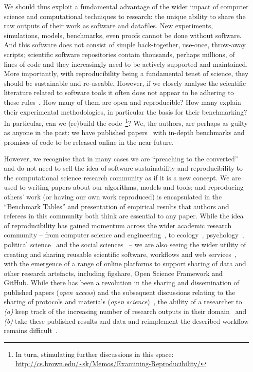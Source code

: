 \documentclass[conference]{IEEEtran}
\begin{document}
We should thus exploit a fundamental advantage of the wider impact of
computer science and computational techniques to research: the unique
ability to share the raw outputs of their work as software and
datafiles. New experiments, simulations, models, benchmarks, even
proofs cannot be done without software. And this software does not
consist of simple hack-together, use-once, throw-away scripts;
scientific software repositories contain thousands, perhaps millions,
of lines of code and they increasingly need to be actively supported
and maintained. More importantly, with reproducibility being a
fundamental tenet of science, they should be sustainable and re-useable. However, if
we closely analyse the scientific literature related to software tools
it often does not appear to be adhering to these
rules~\cite{nature:2011}. How many of them are open and reproducible? How many
explain their experimental methodologies, in particular the basis for
their benchmarking? In particular, can we (re)build the
code~\cite{collberg-et-al:2014}\footnote{In turn, stimulating further
discussions in this space:
\url{http://cs.brown.edu/~sk/Memos/Examining-Reproducibility/}}? We,
the authors, are perhaps as guilty as anyone in the past: we have
published papers~\cite{crick-et-al:2009a,berdine-et-al:2011} with
in-depth benchmarks and promises of code to be released online in the
near future.

However, we recognise that in many cases we are ``preaching to the
converted'' and do not need to sell the idea of software
sustainability and reproducibility to the computational science
research community as if it is a new concept. We are used to writing
papers about our algorithms, models and tools; and reproducing others'
work (or having our own work reproduced) is encapsulated in the
``Benchmark Tables'' and presentation of empirical results that
authors and referees in this community both think are essential to any
paper. While the idea of reproducibility has gained momentum across
the wider academic research community -- from computer science and
engineering~\cite{ledet-et-al:2014,collberg-et-al:2015}, to
ecology~\cite{thiele+grimm:2015},
psychology~\cite{chambers-et-al:2014}, political
science~\cite{king:1995} and the social
sciences~\cite{conte-et-al:2012,hutton+henderson:2015} -- we are also
seeing the wider utility of creating and sharing reusable scientific
software, workflows and web
services~\cite{davidson+freire:2008,crick-et-al:2009b,goble:2014,oabarriaga-et-al:2014},
with the emergence of a range of online platforms to support sharing
of data and other research artefacts, including figshare, Open Science
Framework and GitHub. While there has been a revolution in the sharing
and dissemination of published papers (\emph{open access}) and the
subsequent discussions relating to the sharing of protocols and
materials (\emph{open
science})~\cite{pantonprinciples:2010,force11:2011,rssaaoe:2012}, the
ability of a researcher to {\emph{(a)}} keep track of the increasing
number of research outputs in their domain~\cite{parolo-et-al:2015}
and {\emph{(b)}} take these published results and data and reimplement
the described workflow remains
difficult~\cite{peng:2011,koop-et-al:2011,sandve-et-al:2013,wilson-et-al:2014}.
\end{document}
